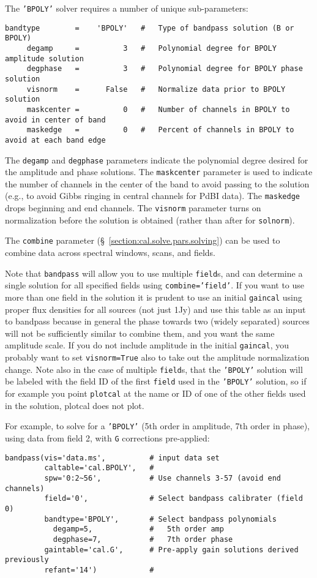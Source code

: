 The {\tt 'BPOLY'} solver requires a number of unique sub-parameters:
\small
\begin{verbatim}
bandtype        =    'BPOLY'   #   Type of bandpass solution (B or BPOLY)
     degamp     =          3   #   Polynomial degree for BPOLY amplitude solution
     degphase   =          3   #   Polynomial degree for BPOLY phase solution
     visnorm    =      False   #   Normalize data prior to BPOLY solution
     maskcenter =          0   #   Number of channels in BPOLY to avoid in center of band
     maskedge   =          0   #   Percent of channels in BPOLY to avoid at each band edge
\end{verbatim}
\normalsize
The {\tt degamp} and {\tt degphase} parameters indicate the polynomial degree
desired for the amplitude and phase solutions.  The {\tt maskcenter}
parameter is used to indicate the number of channels in the center
of the band to avoid passing to the solution (e.g., to avoid Gibbs
ringing in central channels for PdBI data).  The {\tt maskedge} drops
beginning and end channels.  The {\tt visnorm} parameter turns on
normalization before the solution is obtained (rather than after for
{\tt solnorm}).

The {\tt combine} parameter (\S~\ref{section:cal.solve.pars.solving}) 
can be used to combine data across spectral windows, scans, and
fields.

Note that {\tt bandpass} will allow you to use multiple {\tt field}s,
and can determine a single solution for all specified fields using
{\tt combine='field'}.   If you want to use more than one
field in the solution it is prudent to use an initial {\tt gaincal}
using proper flux densities for all sources (not just 1Jy)
and use this table as an input to bandpass
because in general the phase towards two (widely separated) sources
will not be sufficiently similar to combine them, and you want the
same amplitude scale.  If you do not
include amplitude in the initial {\tt gaincal}, you probably want
to set {\tt visnorm=True} also to take out the amplitude normalization
change.  Note also in 
the case of multiple {\tt field}s, that the {\tt 'BPOLY'} solution 
will be labeled with the field ID of the first {\tt field} used in
the {\tt 'BPOLY'} solution, so if for example you point {\tt plotcal} at the
name or ID of one of the other fields used in the solution, 
plotcal does not plot.

For example, to solve for a {\tt 'BPOLY'} (5th order in amplitude, 7th order
in phase), using data from field 2, with {\tt G} corrections pre-applied:
\small
\begin{verbatim}
bandpass(vis='data.ms',          # input data set
         caltable='cal.BPOLY',   #
         spw='0:2~56',           # Use channels 3-57 (avoid end channels)
         field='0',              # Select bandpass calibrater (field 0)
         bandtype='BPOLY',       # Select bandpass polynomials
           degamp=5,             #   5th order amp
           degphase=7,           #   7th order phase
         gaintable='cal.G',      # Pre-apply gain solutions derived previously
         refant='14')            #   
\end{verbatim}
\normalsize


